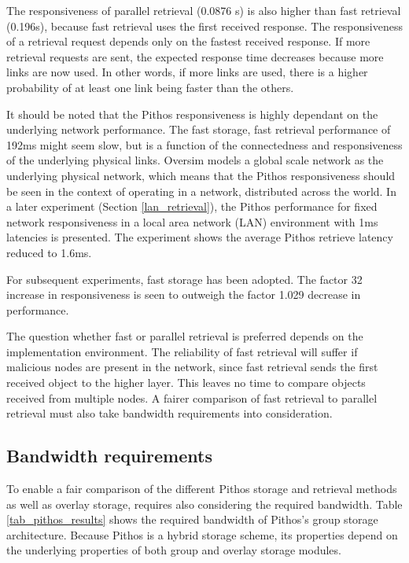 The responsiveness of parallel retrieval (0.0876 s) is also higher than fast retrieval (0.196s), because fast retrieval uses the first received response. The responsiveness of a retrieval request depends only on the fastest received response. If more retrieval requests are sent, the expected response time decreases because more links are now used. In other words, if more links are used, there is a higher probability of at least one link being faster than the others.

It should be noted that the Pithos responsiveness is highly dependant on the underlying network performance. The fast storage, fast retrieval performance of 192ms might seem slow, but is a function of the connectedness and responsiveness of the underlying physical links. Oversim models a global scale network as the underlying physical network, which means that the Pithos responsiveness should be seen in the context of operating in a network, distributed across the world. In a later experiment (Section \ref{lan_retrieval}), the Pithos performance for fixed network responsiveness in a local area network (LAN) environment with 1ms latencies is presented. The experiment shows the average Pithos retrieve latency reduced to 1.6ms.

For subsequent experiments, fast storage has been adopted. The factor 32 increase in responsiveness is seen to outweigh the factor 1.029 decrease in performance.

The question whether fast or parallel retrieval is preferred depends on the implementation environment. The reliability of fast retrieval will suffer if malicious nodes are present in the network, since fast retrieval sends the first received object to the higher layer. This leaves no time to compare objects received from multiple nodes. A fairer comparison of fast retrieval to parallel retrieval must also take bandwidth requirements into consideration.

\subsection{Bandwidth requirements}
\label{bandwidth_requirements}

To enable a fair comparison of the different Pithos storage and retrieval methods as well as overlay storage, requires also considering the required bandwidth. Table \ref{tab_pithos_results} shows the required bandwidth of Pithos's group storage architecture. Because Pithos is a hybrid storage scheme, its properties depend on the underlying properties of both group and overlay storage modules.

